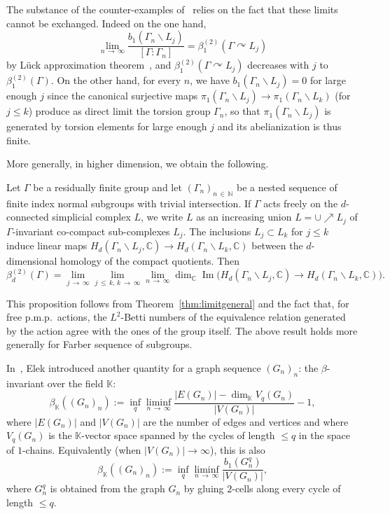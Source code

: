 \documentclass[AHL,Unicode,longabstracts,published]{cedram}
\newcommand{\Nmath}{\mathbb{N}}
\newcommand{\Cmath}{\mathbb{C}}
\newcommand{\Kmath}{\mathbb{K}}
\newcommand{\acting}{\curvearrowright}
\DeclareMathOperator{\Ima}{Im}
\newcommand{\pmp}{p.m.p.\ }
\begin{document}
The substance of the counter-examples of~\cite{Lueck-Osin-2011} relies on the fact that these limits cannot be exchanged. Indeed on the one hand,
\[
\lim\limits_{n\,\to\,\infty}
\frac{b_1(\Gamma_n\backslash L_j)}{[\Gamma:\Gamma_n]}=\beta_1^{(2)}(\Gamma\acting L_j)
\]
by L\"uck approximation theorem~\cite{Luc94b}, and $\beta_1^{(2)}(\Gamma\acting L_j)$ decreases with $j$ to $\beta_1^{(2)}(\Gamma)$. On the other hand, for every $n$, we have $b_1(\Gamma_n\backslash L_j)=0$ for large enough $j$ since the canonical surjective maps $\pi_1(\Gamma_n\backslash L_j)\to \pi_1(\Gamma_n\backslash L_k)$ (for $j\leq k$) produce as direct limit the torsion group $\Gamma_n$, so that $\pi_1(\Gamma_n\backslash L_j)$ is generated by torsion elements for large enough $j$ and its abelianization is thus finite.


More generally, in higher dimension, we obtain the following.
\begin{prop}\label{prop: approx th. non cocompact}
Let $\Gamma$ be a residually finite group and let $(\Gamma_n)_{n\,\in\,\Nmath}$ be a nested sequence of finite index normal subgroups with trivial intersection. If $\Gamma$ acts freely on the $d$-connected simplicial complex $L$, we write $L$ as an increasing union $L=\cup\nearrow L_j$ of $\Gamma$-invariant co-compact sub-complexes $L_j$. The inclusions $ L_j\subset L_k$ for $j\leq k$ induce linear maps $ H_d(\Gamma_n\backslash L_j, \Cmath)\to H_d(\Gamma_n\backslash L_k, \Cmath)$ between the $d$-dimensional homology of the compact quotients. Then
\[
\beta_d^{(2)}(\Gamma)=\lim\limits_{j\,\to\,\infty}\lim\limits_{j\,\leq\,k,\, k\,\to\,\infty}\lim\limits_{n\,\to\,\infty}
\dim_{\Cmath}\Ima\bigl(H_d\left(\Gamma_n\backslash L_j, \Cmath\right)\to H_d\left(\Gamma_n\backslash L_k, \Cmath\right)\bigr).
\]
\end{prop}

This proposition follows from Theorem~\ref{thm:limitgeneral} and the fact that, for free \pmp actions, the $L^2$-Betti numbers of the equivalence relation generated by the action agree with the ones of the group itself. The above result holds more generally for Farber sequence of subgroups.



In~\cite{Elek-combinatorial-cost-2007}, Elek introduced another quantity for a graph sequence $(G_n)_n$: the $\beta$-invariant over the field $\Kmath$:
\[
\beta_\Kmath((G_n)_n):=\inf_q \liminf_{n\,\to\,\infty}\frac{\vert E(G_n)\vert - \dim_\Kmath V_q(G_n)}{\vert V(G_n)\vert} -1,
\]
where $\vert E(G_n)\vert$ and $\vert V(G_n)\vert$ are the number of edges and vertices and where $ V_q(G_n)$ is the $\Kmath$-vector space spanned by the cycles of length $\leq q$ in the space of $1$-chains. Equivalently (when $\vert V(G_n)\vert \to \infty$), this is also
\[
\beta_\Kmath((G_n)_n):=\inf_q \liminf_{n\,\to\,\infty}\frac{b_1(G_n^q)}{\vert V(G_n)\vert},
\]
where $G_n^q$ is obtained from the graph $G_n$ by gluing $2$-cells along every cycle of length $\leq q$.
\end{document}
